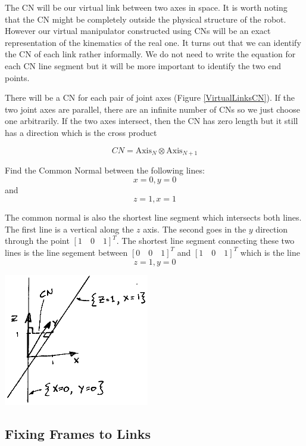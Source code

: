The CN will be our virtual link between two axes in space.   It is worth noting that the CN might be completely outside the physical structure of the robot.  However our virtual manipulator constructed using CNs will be an exact representation of the kinematics of the real one.   It turns out that we can identify the CN of each link rather informally.  We do not need to write the equation for each CN line segment but it will be more important to identify the two end points.

There will be a CN for each pair of joint axes (Figure \ref{VirtualLinksCN}).  If the two joint axes are parallel, there are an infinite number of CNs so we just choose one arbitrarily.  If the two axes intersect, then the CN has zero length but it still has a direction which is the cross product

\begin{equation}
CN = \mathrm{Axis}_N \otimes \mathrm{Axis}_{N+1}
\end{equation}


\begin{ExampleSmall}
Find the Common Normal between the following lines:
\[
x=0, y=0
\]
and
\[
z=1, x=1
\]

The common normal is also the shortest line segment which intersects both lines.   The first line is a vertical along the $z$ axis.  The second goes in the $y$ direction through the point $[1 \quad 0\quad 1]^T$.    The shortest line segment connecting these two lines is the line segement between $[0\quad 0\quad 1]^T$ and $[1\quad 0\quad 1]^T$ which is the line
\[
z=1, y=0
\]

\includegraphics[width=2.5in]{figs03/00338.eps}

\end{ExampleSmall}



\subsection{Fixing Frames to Links}

